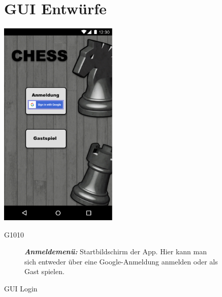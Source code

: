 \documentclass[parskip=full]{scrartcl}
\begin{document}
	
	\begin{figure}[htp]
		\section{GUI Entwürfe}
		
		\begin{minipage}[t]{6cm}
			\vspace{0pt}
			\includegraphics[height=100mm]{gui_login.png}
			\caption{GUI Login}
			\label{fig:GUI Login}
		\end{minipage}
		\hfill
		\begin{minipage}[t]{6cm}
			\vspace{0pt}
			\begin{description}
				\item[G1010] \textbf{\textit{Anmeldemenü: }} Startbildschirm der App. Hier kann man sich entweder über eine Google-Anmeldung anmelden oder als Gast spielen.
			\end{description}
		\end{minipage}
		

\end{figure}
\end{document}
